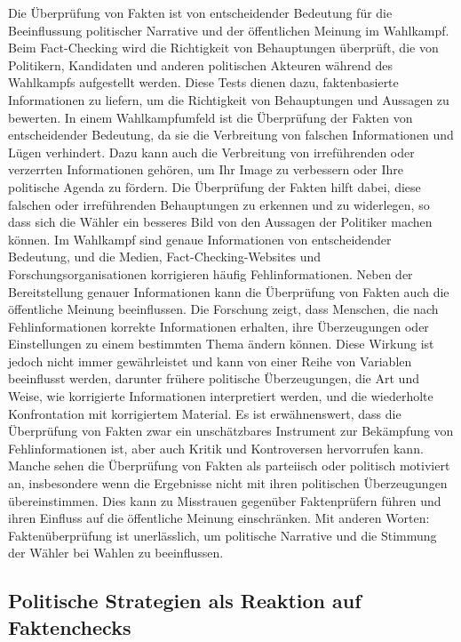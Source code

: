 \documentclass[a4paper,listof=totoc,bibliography=totoc]{scrartcl}
\begin{document}
Die Überprüfung von Fakten ist von entscheidender Bedeutung für die Beeinflussung politischer Narrative und der öffentlichen Meinung im Wahlkampf. Beim Fact-Checking wird 
die Richtigkeit von Behauptungen überprüft, die von Politikern, Kandidaten und anderen politischen Akteuren während des Wahlkampfs aufgestellt werden. Diese Tests dienen dazu, 
faktenbasierte Informationen zu liefern, um die Richtigkeit von Behauptungen und Aussagen zu bewerten. In einem Wahlkampfumfeld ist die Überprüfung der Fakten von 
entscheidender Bedeutung, da sie die Verbreitung von falschen Informationen und Lügen verhindert. Dazu kann auch die Verbreitung von irreführenden oder verzerrten Informationen 
gehören, um Ihr Image zu verbessern oder Ihre politische Agenda zu fördern. 
\newline
\newline
Die Überprüfung der Fakten hilft dabei, diese falschen oder irreführenden Behauptungen zu erkennen 
und zu widerlegen, so dass sich die Wähler ein besseres Bild von den Aussagen der Politiker machen können. Im Wahlkampf sind genaue Informationen von entscheidender Bedeutung, 
und die Medien, Fact-Checking-Websites und Forschungsorganisationen korrigieren häufig Fehlinformationen. Neben der Bereitstellung genauer Informationen kann die Überprüfung von 
Fakten auch die öffentliche Meinung beeinflussen. Die Forschung zeigt, dass Menschen, die nach Fehlinformationen korrekte Informationen erhalten, ihre Überzeugungen oder 
Einstellungen zu einem bestimmten Thema ändern können. Diese Wirkung ist jedoch nicht immer gewährleistet und kann von einer Reihe von Variablen beeinflusst werden, darunter 
frühere politische Überzeugungen, die Art und Weise, wie korrigierte Informationen interpretiert werden, und die wiederholte Konfrontation mit korrigiertem Material. 
Es ist erwähnenswert, dass die Überprüfung von Fakten zwar ein unschätzbares Instrument zur Bekämpfung von Fehlinformationen ist, aber auch Kritik und Kontroversen hervorrufen 
kann. Manche sehen die Überprüfung von Fakten als parteiisch oder politisch motiviert an, insbesondere wenn die Ergebnisse nicht mit ihren politischen Überzeugungen übereinstimmen. 
Dies kann zu Misstrauen gegenüber Faktenprüfern führen und ihren Einfluss auf die öffentliche Meinung einschränken. Mit anderen Worten: Faktenüberprüfung ist unerlässlich, um 
politische Narrative und die Stimmung der Wähler bei Wahlen zu beeinflussen.

\subsection{Politische Strategien als Reaktion auf Faktenchecks}
\end{document}
